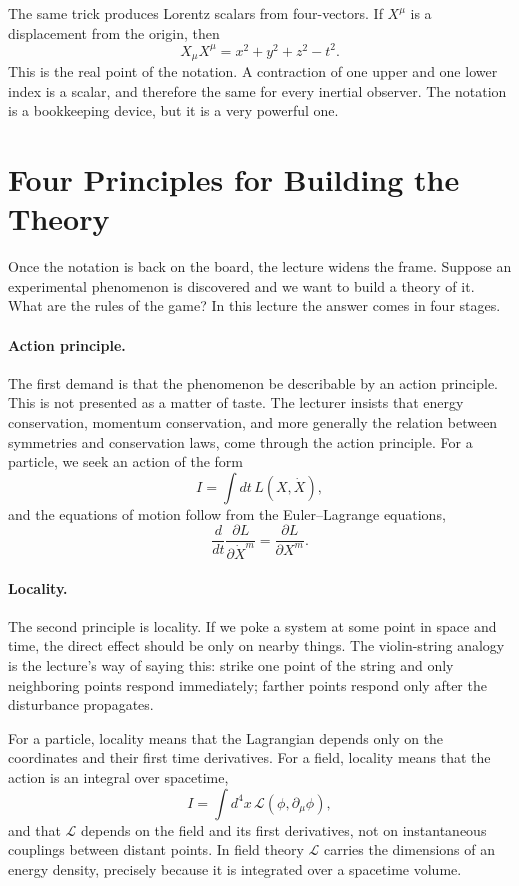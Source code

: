 The same trick produces Lorentz scalars from four-vectors. If \(X^\mu\) is a displacement from the origin, then
\begin{equation}
X_\mu X^\mu = x^2+y^2+z^2-t^2.
\end{equation}
This is the real point of the notation. A contraction of one upper and one lower index is a scalar, and therefore the same for every inertial observer. The notation is a bookkeeping device, but it is a very powerful one.

\section{Four Principles for Building the Theory}

Once the notation is back on the board, the lecture widens the frame. Suppose an experimental phenomenon is discovered and we want to build a theory of it. What are the rules of the game? In this lecture the answer comes in four stages.

\paragraph{Action principle.}
The first demand is that the phenomenon be describable by an action principle. This is not presented as a matter of taste. The lecturer insists that energy conservation, momentum conservation, and more generally the relation between symmetries and conservation laws, come through the action principle. For a particle, we seek an action of the form
\begin{equation}
I = \int dt\,L(X,\dot X),
\end{equation}
and the equations of motion follow from the Euler--Lagrange equations,
\begin{equation}
\frac{d}{dt}\frac{\partial L}{\partial \dot X^m}=\frac{\partial L}{\partial X^m}.
\end{equation}

\paragraph{Locality.}
The second principle is locality. If we poke a system at some point in space and time, the direct effect should be only on nearby things. The violin-string analogy is the lecture's way of saying this: strike one point of the string and only neighboring points respond immediately; farther points respond only after the disturbance propagates.

For a particle, locality means that the Lagrangian depends only on the coordinates and their first time derivatives. For a field, locality means that the action is an integral over spacetime,
\begin{equation}
I = \int d^4x\,\mathcal L(\phi,\partial_\mu\phi),
\end{equation}
and that \(\mathcal L\) depends on the field and its first derivatives, not on instantaneous couplings between distant points. In field theory \(\mathcal L\) carries the dimensions of an energy density, precisely because it is integrated over a spacetime volume.

